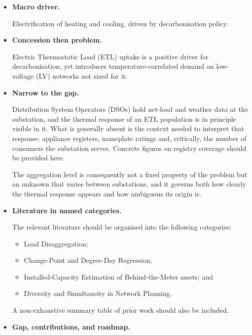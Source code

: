 \documentclass[9pt,journal,a4]{IEEEtran}
\begin{document}
\begin{itemize}

\item \textbf{Macro driver.}

Electrification of heating and cooling, driven by decarbonisation policy.


\item \textbf{Concession then problem.}

Electric Thermostatic Load (ETL) uptake is a positive driver for decarbonisation, yet introduces temperature-correlated demand on low-voltage (LV) networks not sized for it.


\item \textbf{Narrow to the gap.}

Distribution System Operators (DSOs) hold net-load and weather data at the substation, and the thermal response of an ETL population is in principle visible in it. What is generally absent is the context needed to interpret that response: appliance registers, nameplate ratings and, critically, the number of consumers the substation serves. Concrete figures on registry coverage should be provided here.

The aggregation level is consequently not a fixed property of the problem but an unknown that varies between substations, and it governs both how clearly the thermal response appears and how ambiguous its origin is.


\item \textbf{Literature in named categories.}

The relevant literature should be organised into the following categories:

\begin{itemize}

\item Load Disaggregation;

\item Change-Point and Degree-Day Regression;

\item Installed-Capacity Estimation of Behind-the-Meter assets; and

\item Diversity and Simultaneity in Network Planning.

\end{itemize}

A non-exhaustive summary table of prior work should also be included.


\item \textbf{Gap, contributions, and roadmap.}


\end{itemize}
\end{document}
